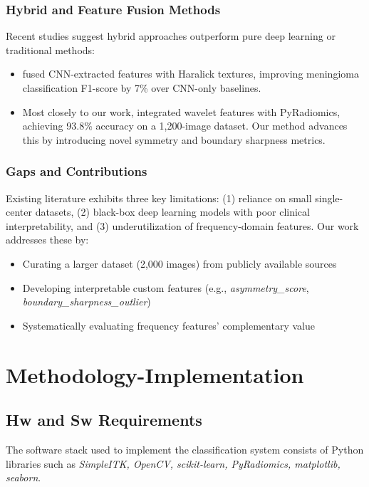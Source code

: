 \documentclass[11pt,a4paper]{report}
\begin{document}
\subsection{Hybrid and Feature Fusion Methods}
Recent studies suggest hybrid approaches outperform pure deep learning or traditional methods:
\begin{itemize}
    \item  fused CNN-extracted features with Haralick textures, improving meningioma classification F1-score by 7\% over CNN-only baselines.
    \item Most closely to our work,  integrated wavelet features with PyRadiomics, achieving 93.8\% accuracy on a 1,200-image dataset. Our method advances this by introducing novel symmetry and boundary sharpness metrics.
\end{itemize}

\subsection{Gaps and Contributions}
Existing literature exhibits three key limitations: (1) reliance on small single-center datasets, (2) black-box deep learning models with poor clinical interpretability, and (3) underutilization of frequency-domain features. Our work addresses these by:
\begin{itemize}
    \item Curating a larger dataset (2,000 images) from publicly available sources
    \item Developing interpretable custom features (e.g., \textit{asymmetry\_score}, \textit{boundary\_sharpness\_outlier})
    \item Systematically evaluating frequency features' complementary value
\end{itemize}












\chapter{Methodology-Implementation}
    \section{Hw and Sw Requirements}
	\par The software stack used to implement the classification system consists of Python libraries
	such as \textit{SimpleITK, OpenCV, scikit-learn, PyRadiomics, matplotlib, seaborn}.
\end{document}

